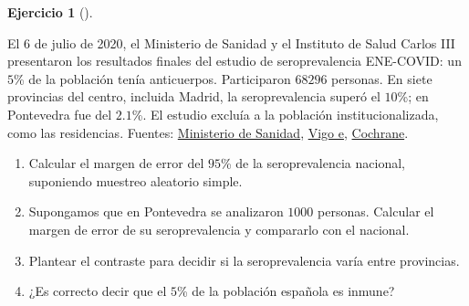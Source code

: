 \documentclass[
  spanish,
  a4paper,
]{scrreport}
\theoremstyle{definition}
\newtheorem{exercise}{Ejercicio}[chapter]
\theoremstyle{remark}
\begin{document}
\begin{exercise}[]\protect\hypertarget{exr-interpretacion-ene-covid}{}\label{exr-interpretacion-ene-covid}

El 6 de julio de 2020, el Ministerio de Sanidad y el Instituto de Salud
Carlos III presentaron los resultados finales del estudio de
seroprevalencia ENE-COVID: un \(5\)\% de la población tenía anticuerpos.
Participaron \(68296\) personas. En siete provincias del centro,
incluida Madrid, la seroprevalencia superó el \(10\)\%; en Pontevedra
fue del \(2.1\)\%. El estudio excluía a la población institucionalizada,
como las residencias. Fuentes:
\href{https://www.sanidad.gob.es/gl/gabinete/notasPrensa.do?id=4994}{Ministerio
de Sanidad}, \href{https://www.vigoe.es/?p=239097}{Vigo e},
\href{https://es.cochrane.org/es/prevalencia-de-sars-cov-2-en-espa\%C3\%B1a}{Cochrane}.

\begin{enumerate}
\def\labelenumi{\alph{enumi}.}
\item
  Calcular el margen de error del \(95\)\% de la seroprevalencia
  nacional, suponiendo muestreo aleatorio simple.
\item
  Supongamos que en Pontevedra se analizaron \(1000\) personas. Calcular
  el margen de error de su seroprevalencia y compararlo con el nacional.
\item
  Plantear el contraste para decidir si la seroprevalencia varía entre
  provincias.
\item
  ¿Es correcto decir que el \(5\)\% de la población española es inmune?
\end{enumerate}

\end{exercise}
\end{document}
